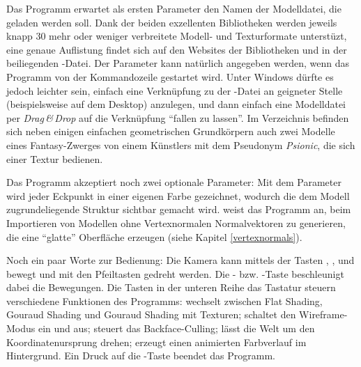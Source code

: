 Das Programm erwartet als ersten Parameter den Namen der Modelldatei, die geladen werden soll. Dank der beiden exzellenten Bibliotheken werden jeweils knapp 30 mehr oder weniger verbreitete Modell- und Texturformate unterstüzt, eine genaue Auflistung findet sich auf den Websites der Bibliotheken und in der beiliegenden -Datei. Der Parameter kann natürlich angegeben werden, wenn das Programm von der Kommandozeile gestartet wird. Unter Windows dürfte es jedoch leichter sein, einfach eine Verknüpfung zu der -Datei an geigneter Stelle (beispielsweise auf dem Desktop) anzulegen, und dann einfach eine Modelldatei per \emph{Drag\,\&\,Drop} auf die Verknüpfung \enquote{fallen zu lassen}. Im Verzeichnis  befinden sich neben einigen einfachen geometrischen Grundkörpern auch zwei Modelle eines Fantasy-Zwerges von einem Künstlers mit dem Pseudonym \emph{Psionic}, die sich einer Textur bedienen.

Das Programm akzeptiert noch zwei optionale Parameter: Mit dem Parameter  wird jeder Eckpunkt in einer eigenen Farbe gezeichnet, wodurch die dem Modell zugrundeliegende Struktur sichtbar gemacht wird.  weist das Programm an, beim Importieren von Modellen ohne Vertexnormalen Normalvektoren zu generieren, die eine \enquote{glatte} Oberfläche erzeugen (siehe Kapitel \ref{vertexnormals}).

Noch ein paar Worte zur Bedienung: Die Kamera kann mittels der Tasten , ,  und  bewegt und mit den Pfeiltasten gedreht werden. Die - bzw. -Taste beschleunigt dabei die Bewegungen. Die Tasten in der unteren Reihe das Tastatur steuern verschiedene Funktionen des Programms:  wechselt zwischen Flat Shading, Gouraud Shading und Gouraud Shading mit Texturen;  schaltet den Wireframe-Modus ein und aus;  steuert das Backface-Culling;  lässt die Welt um den Koordinatenursprung drehen;  erzeugt einen animierten Farbverlauf im Hintergrund. Ein Druck auf die -Taste beendet das Programm.